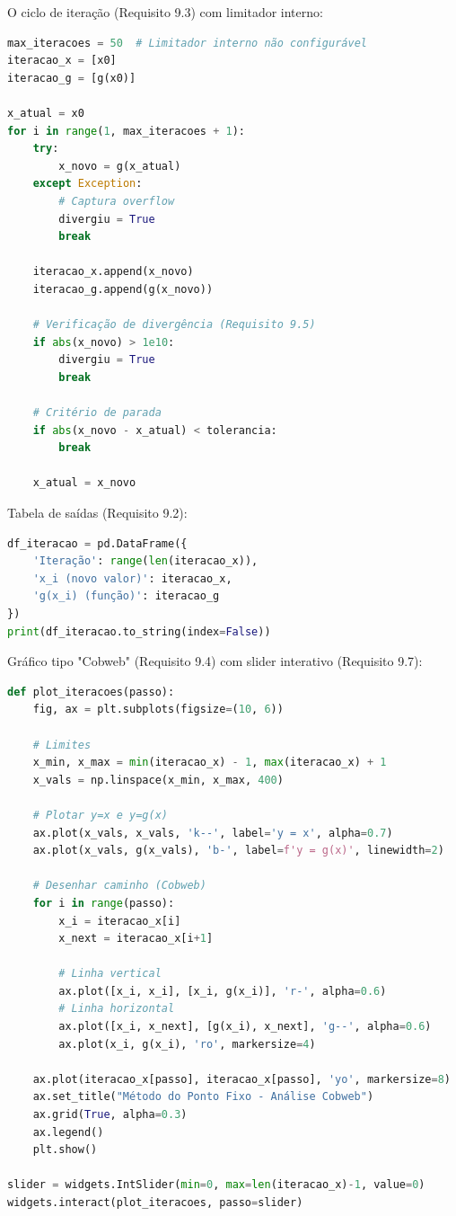 \documentclass[
	12pt,				%
	openright,			%
	oneside,			%
	a4paper,			%
	english,			%
	brazil				%
	]{abntex2}
\begin{document}
O ciclo de iteração (Requisito 9.3) com limitador interno:

\begin{lstlisting}[language=Python, caption={Requisito 9.3 - Ciclo com Limitador}]
max_iteracoes = 50  # Limitador interno não configurável
iteracao_x = [x0]
iteracao_g = [g(x0)]

x_atual = x0
for i in range(1, max_iteracoes + 1):
    try:
        x_novo = g(x_atual)
    except Exception:
        # Captura overflow
        divergiu = True
        break
    
    iteracao_x.append(x_novo)
    iteracao_g.append(g(x_novo))
    
    # Verificação de divergência (Requisito 9.5)
    if abs(x_novo) > 1e10:
        divergiu = True
        break
    
    # Critério de parada
    if abs(x_novo - x_atual) < tolerancia:
        break
    
    x_atual = x_novo
\end{lstlisting}

Tabela de saídas (Requisito 9.2):

\begin{lstlisting}[language=Python, caption={Requisito 9.2 - Tabela de Iterações}]
df_iteracao = pd.DataFrame({
    'Iteração': range(len(iteracao_x)),
    'x_i (novo valor)': iteracao_x,
    'g(x_i) (função)': iteracao_g
})
print(df_iteracao.to_string(index=False))
\end{lstlisting}

Gráfico tipo "Cobweb" (Requisito 9.4) com slider interativo (Requisito 9.7):

\begin{lstlisting}[language=Python, caption={Requisito 9.4/9.7 - Gráfico Interativo}]
def plot_iteracoes(passo):
    fig, ax = plt.subplots(figsize=(10, 6))
    
    # Limites
    x_min, x_max = min(iteracao_x) - 1, max(iteracao_x) + 1
    x_vals = np.linspace(x_min, x_max, 400)
    
    # Plotar y=x e y=g(x)
    ax.plot(x_vals, x_vals, 'k--', label='y = x', alpha=0.7)
    ax.plot(x_vals, g(x_vals), 'b-', label=f'y = g(x)', linewidth=2)
    
    # Desenhar caminho (Cobweb)
    for i in range(passo):
        x_i = iteracao_x[i]
        x_next = iteracao_x[i+1]
        
        # Linha vertical
        ax.plot([x_i, x_i], [x_i, g(x_i)], 'r-', alpha=0.6)
        # Linha horizontal
        ax.plot([x_i, x_next], [g(x_i), x_next], 'g--', alpha=0.6)
        ax.plot(x_i, g(x_i), 'ro', markersize=4)
    
    ax.plot(iteracao_x[passo], iteracao_x[passo], 'yo', markersize=8)
    ax.set_title("Método do Ponto Fixo - Análise Cobweb")
    ax.grid(True, alpha=0.3)
    ax.legend()
    plt.show()

slider = widgets.IntSlider(min=0, max=len(iteracao_x)-1, value=0)
widgets.interact(plot_iteracoes, passo=slider)
\end{lstlisting}
\end{document}
